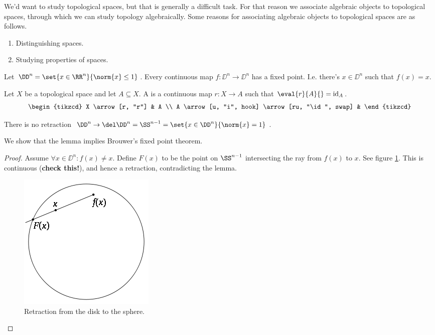 \documentclass[10pt,a4paper,twoside,openany,hidelinks]{book}
\begin{document}
We'd want to study topological spaces, but that is generally a difficult task. For that reason we associate algebraic objects to topological spaces, through which we can study topology algebraically.
Some reasons for associating algebraic objects to topological spaces are as follows.
\begin{enumerate}
\item Distinguishing spaces.
\item Studying properties of spaces.
\end{enumerate}
\begin{example}
Let $\DD^n = \set{x \in \RR^n}{\norm{x} \leq 1}$.
Every continuous map $f \colon \DD^n \to \DD^n$ has a fixed point.
I.e. there's $x \in \DD^n$ such that $f(x) = x$.
\end{example}
\begin{definition}
Let $X$ be a topological space and let $A \subseteq X$. A  is a continuous map $r \colon X \to A$ such that $\eval{r}{A}{} = \mathrm{id}_A$.
\[
\begin{tikzcd}
X \arrow[r, "r"] & A \\
A \arrow[u, "i", hook] \arrow[ru, "\id", swap] &
\end{tikzcd}
\]
\end{definition}
\begin{lemma}
There is no retraction $\DD^n \to \del \DD^n = \SS^{n-1} = \set{x \in \DD^n}{\norm{x}=1}$.
\end{lemma}
We show that the lemma implies Brouwer's fixed point theorem. \\
\begin{proof}
Assume $\forall x \in \DD^n \colon f(x) \neq x$.
Define $F(x)$ to be the point on $\SS^{n-1}$ intersecting the ray from $f(x)$ to $x$. See figure \ref{retraction_lemma}.
This is continuous (\textbf{check this!}), and hence a retraction, contradicting the lemma.
\begin{figure}[h!]
\begin{center}
\caption{Retraction from the disk to the sphere.}
\label{retraction_lemma}
\includegraphics[scale=0.7]{sources/retraction_lemma}
\end{center}
\end{figure}
\end{proof}
\end{document}
